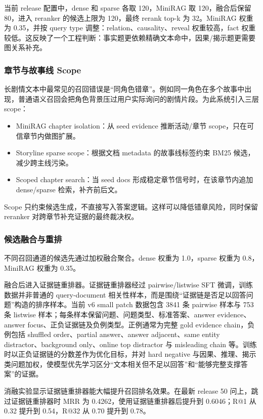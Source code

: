 \documentclass[UTF8,a4paper,12pt]{ctexart}
\begin{document}
当前 release 配置中，dense 和 sparse 各取 120，MiniRAG 取 120，融合后保留 80，进入 reranker 的候选上限为 120，最终 rerank top-k 为 32。MiniRAG 权重为 0.35，并按 query type 调整：relation、causality、reveal 权重较高，fact 权重较低。这反映了一个工程判断：事实题更依赖精确文本命中，因果/揭示题更需要图关系补充。

\subsubsection{章节与故事线 Scope}

长剧情文本中最常见的召回错误是“同角色错章”。例如同一角色在多个故事中出现，普通语义召回会把角色背景压过用户实际询问的剧情片段。为此系统引入三层 scope：
\begin{itemize}
  \item MiniRAG chapter isolation：从 seed evidence 推断活动/章节 scope，只在可信章节内做图扩展。
  \item Storyline sparse scope：根据文档 metadata 的故事线标签约束 BM25 候选，减少跨主线污染。
  \item Scoped chapter search：当 seed docs 形成稳定章节信号时，在该章节内追加 dense/sparse 检索，补齐前后文。
\end{itemize}

Scope 只约束候选生成，不直接写入答案逻辑。这样可以降低错章风险，同时保留 reranker 对跨章节补充证据的最终裁决权。

\subsubsection{候选融合与重排}

不同召回通道的候选先通过加权融合聚合。dense 权重为 1.0，sparse 权重为 0.8，MiniRAG 权重为 0.35。

融合后进入证据链重排器。证据链重排器经过 pairwise/listwise SFT 微调，训练数据并非普通的 query-document 相关性样本，而是围绕“证据链是否足以回答问题”构造的排序样本。当前 v6 small patch 数据包含 3841 条 pairwise 样本与 753 条 listwise 样本；每条样本保留问题、问题类型、标准答案、answer evidence、answer focus、正负证据链及负例类型。正例通常为完整 gold evidence chain，负例包括 shuffled order、partial answer、answer adjacent、same entity distractor、background only、online top distractor 与 misleading chain 等。训练时以正负证据链的分数差作为优化目标，并对 hard negative 与因果、推理、揭示类问题加权，使模型优先学习区分“文本相关但不足以回答”和“能够完整支撑答案”的证据。

消融实验显示证据链重排器能大幅提升召回排名效果。在最新 release 50 问上，跳过证据链重排器时 MRR 为 0.4262，使用证据链重排器后提升到 0.6046；R@1 从 0.32 提升到 0.54，R@32 从 0.70 提升到 0.78。
\end{document}
